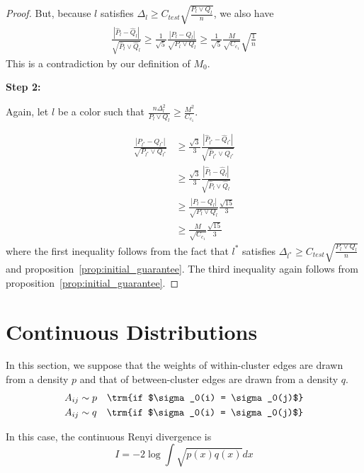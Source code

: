 \documentclass{article}
\begin{document}
\begin{proof}
But, because $l$ satisfies $\Delta_l \geq C_{test} \sqrt{ \frac{P_l \vee Q_l}{n}}$, we also have
\begin{align*}
\frac{| \hat{P}_l - \hat{Q}_l | }{\sqrt{ \hat{P}_l \vee \hat{Q}_l}} 
  \geq \frac{1}{\sqrt{5}} \frac{ | P_l - Q_l|}{\sqrt{P_l \vee Q_l}} 
   \geq \frac{1}{\sqrt{5}} \frac{M}{\sqrt{C_{c_1}}} \sqrt{ \frac{1}{n}}
\end{align*}
This is a contradiction by our definition of $M_0$. 

\textbf{Step 2:}

Again, let $l$ be a color such that $\frac{n \Delta_l^2}{P_l \vee Q_l} \geq \frac{M^2}{C_{c_1}}$.

\begin{align*}
\frac{ |P_{l^*} - Q_{l^*}|}{\sqrt{ P_{l^*} \vee Q_{l^*}}} &\geq 
\frac{\sqrt{3}}{3} \frac{|\hat{P}_{l^*} - \hat{Q}_{l^*} | }{\sqrt{ \hat{P}_{l^*} \vee \hat{Q}_{l^*} }} 
  \\
& \geq
\frac{\sqrt{3}}{3} \frac{|\hat{P}_l - \hat{Q}_l | }{\sqrt{ \hat{P}_l \vee \hat{Q}_l}}  \\
 &\geq \frac{|P_l - Q_l|}{\sqrt{P_l \vee Q_l}} \frac{\sqrt{15}}{3}  \\
 &\geq \frac{M}{\sqrt{C_{c_1}}} \frac{\sqrt{15}}{3} 
\end{align*}
where the first inequality follows from the fact that $l^*$ satisfies $\Delta_{l^*} \geq C_{test} \sqrt{ \frac{P_l \vee Q_l}{n}}$ and proposition~\ref{prop:initial_guarantee}. The third inequality again follows from proposition~\ref{prop:initial_guarantee}.


\end{proof}

\section{Continuous Distributions}

In this section, we suppose that the weights of within-cluster edges are drawn from a density $p$ and that of between-cluster edges are drawn from a density $q$.
\begin{align*}
A_{ij} &\sim p  \quad \trm{if $\sigma_0(i) = \sigma_0(j)$} \\
A_{ij} &\sim q  \quad \trm{if $\sigma_0(i) = \sigma_0(j)$}
\end{align*}

In this case, the continuous Renyi divergence is 
\[
I = -2 \log \int \sqrt{p(x)q(x)} dx 
\]
\end{document}

